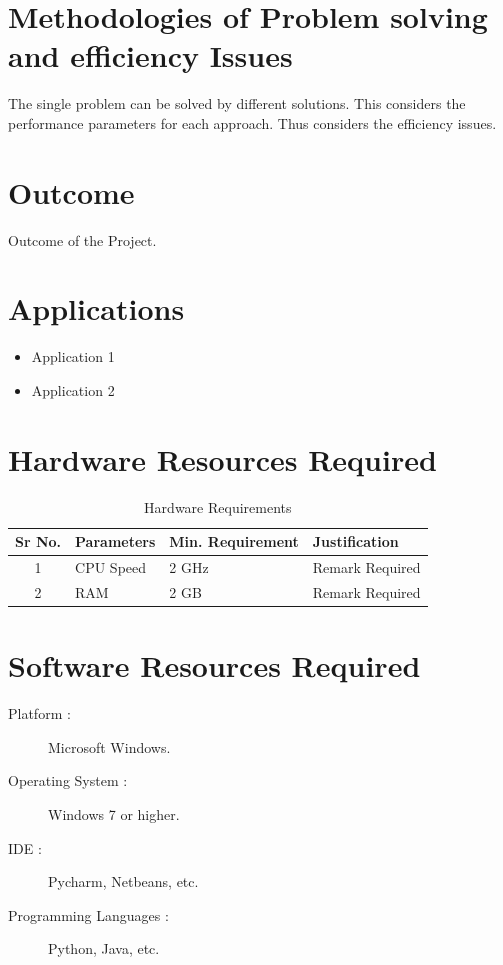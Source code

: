 \documentclass{report} %
\begin{document}
		\section{Methodologies of Problem solving and efficiency Issues}
		The single problem can be solved by different solutions. This considers the
		performance parameters for each approach. Thus considers the efficiency issues.
		
		\section{Outcome}
		Outcome of the Project.
		
		\section{Applications}
		\begin{itemize}
			\item Application 1
			\item Application 2
		\end{itemize}
		
		\section{Hardware Resources Required}
		\begin{table}[H]
			\centering
			\renewcommand{\arraystretch}{1.5}
			\begin{tabular}{|c|l|l|l|}
				\hline
				\textbf{Sr No.} & \textbf{Parameters} & \textbf{Min. Requirement} & \textbf{Justification} \\
				\hline
				1 & CPU Speed & 2 GHz & Remark Required \\
				\hline
				2 & RAM & 2 GB & Remark Required \\
				\hline
			\end{tabular}
			\caption{Hardware Requirements}
		\end{table}
		
		\section{Software Resources Required}
		\begin{description}
			\item [Platform :] Microsoft Windows.
			\item [Operating System :] Windows 7 or higher.
			\item [IDE :] Pycharm, Netbeans, etc.
			\item [Programming Languages :] Python, Java, etc.
		\end{description}
\end{document}
